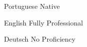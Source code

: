 

\begin{cvlangs}

  \cvlang
    {Portuguese} %
    {Native} %
    {} %
    {} %

  \cvlang
    {English} %
    {Fully Professional} %
    {} %
    {} %

  \cvlang
    {Deutsch} %
    {No Proficiency} %
    {} %
    {} %

\end{cvlangs}
